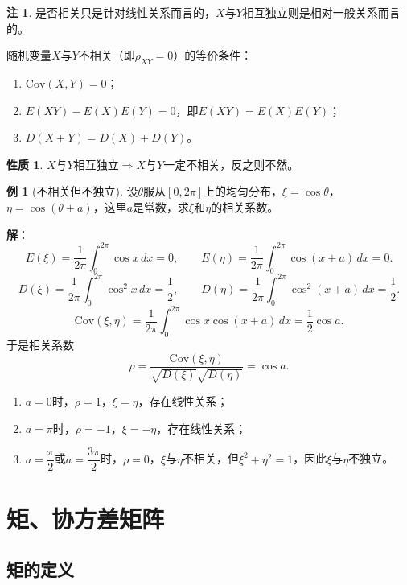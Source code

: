 \documentclass[11pt,a4paper]{report}
\theoremstyle{definition}
\newtheorem{example}{例}[chapter]
\newtheorem{note}{注}[chapter]
\newtheorem{property}{性质}[chapter]
\begin{document}
\begin{note}
是否相关只是针对线性关系而言的，$X$与$Y$相互独立则是相对一般关系而言的。
\end{note}

随机变量$X$与$Y$不相关（即$\rho_{XY}=0$）的等价条件：
\begin{enumerate}[label=(\arabic*),leftmargin=2em]
    \item $\mathrm{Cov}(X,Y)=0$；
    \item $E(XY)-E(X)E(Y)=0$，即$E(XY)=E(X)E(Y)$；
    \item $D(X+Y)=D(X)+D(Y)$。
\end{enumerate}

\begin{property}
$X$与$Y$相互独立$\Longrightarrow$$X$与$Y$一定不相关，反之则不然。
\end{property}

\begin{example}[不相关但不独立]
设$\theta$服从$[0,2\pi]$上的均匀分布，$\xi=\cos\theta$，$\eta=\cos(\theta+a)$，这里$a$是常数，求$\xi$和$\eta$的相关系数。
\end{example}

\textbf{解}：
\[
E(\xi)=\frac{1}{2\pi}\int_{0}^{2\pi}\cos x\,dx=0,\qquad
E(\eta)=\frac{1}{2\pi}\int_{0}^{2\pi}\cos(x+a)\,dx=0.
\]
\[
D(\xi)=\frac{1}{2\pi}\int_{0}^{2\pi}\cos^{2}x\,dx=\frac{1}{2},\qquad
D(\eta)=\frac{1}{2\pi}\int_{0}^{2\pi}\cos^{2}(x+a)\,dx=\frac{1}{2}.
\]
\[
\mathrm{Cov}(\xi,\eta)=\frac{1}{2\pi}\int_{0}^{2\pi}\cos x\cos(x+a)\,dx=\frac{1}{2}\cos a.
\]
于是相关系数
\[
\rho=\frac{\mathrm{Cov}(\xi,\eta)}{\sqrt{D(\xi)}\sqrt{D(\eta)}}=\cos a.
\]

\begin{enumerate}[label=\arabic*.,leftmargin=2em]
    \item $a=0$时，$\rho=1$，$\xi=\eta$，存在线性关系；
    \item $a=\pi$时，$\rho=-1$，$\xi=-\eta$，存在线性关系；
    \item $a=\dfrac{\pi}{2}$或$a=\dfrac{3\pi}{2}$时，$\rho=0$，$\xi$与$\eta$不相关，但$\xi^{2}+\eta^{2}=1$，因此$\xi$与$\eta$不独立。
\end{enumerate}

\section{矩、协方差矩阵}

\subsection{矩的定义}
\end{document}
